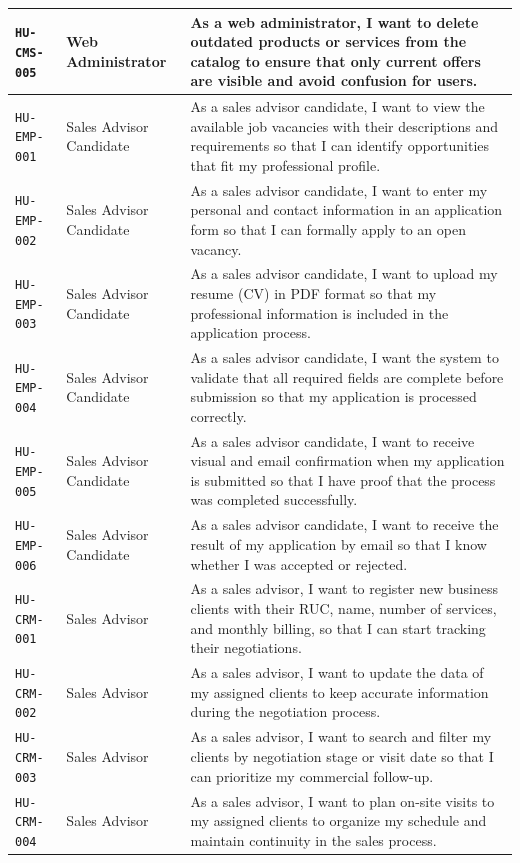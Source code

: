 \documentclass[letterpaper%
, oneside%
, 12pt%
, memoireprojet%
, english%
,creativecommons,hyperref, withAlgo2e %
]{thETS}
\begin{document}
\begin{longtable}{|L{2.5cm}|L{3.2cm}|L{7.9cm}|}
\hline
\texttt{HU-CMS-005} & Web Administrator & As a web administrator, I want to delete outdated products or services from the catalog to ensure that only current offers are visible and avoid confusion for users. \\
\hline
\texttt{HU-EMP-001} & Sales Advisor Candidate & As a sales advisor candidate, I want to view the available job vacancies with their descriptions and requirements so that I can identify opportunities that fit my professional profile. \\
\hline
\texttt{HU-EMP-002} & Sales Advisor Candidate & As a sales advisor candidate, I want to enter my personal and contact information in an application form so that I can formally apply to an open vacancy. \\
\hline
\texttt{HU-EMP-003} & Sales Advisor Candidate & As a sales advisor candidate, I want to upload my resume (CV) in PDF format so that my professional information is included in the application process. \\
\hline
\texttt{HU-EMP-004} & Sales Advisor Candidate & As a sales advisor candidate, I want the system to validate that all required fields are complete before submission so that my application is processed correctly. \\
\hline
\texttt{HU-EMP-005} & Sales Advisor Candidate & As a sales advisor candidate, I want to receive visual and email confirmation when my application is submitted so that I have proof that the process was completed successfully. \\
\hline
\texttt{HU-EMP-006} & Sales Advisor Candidate & As a sales advisor candidate, I want to receive the result of my application by email so that I know whether I was accepted or rejected. \\
\hline
\texttt{HU-CRM-001} & Sales Advisor & As a sales advisor, I want to register new business clients with their RUC, name, number of services, and monthly billing, so that I can start tracking their negotiations. \\
\hline
\texttt{HU-CRM-002} & Sales Advisor & As a sales advisor, I want to update the data of my assigned clients to keep accurate information during the negotiation process. \\
\hline
\texttt{HU-CRM-003} & Sales Advisor & As a sales advisor, I want to search and filter my clients by negotiation stage or visit date so that I can prioritize my commercial follow-up. \\
\hline
\texttt{HU-CRM-004} & Sales Advisor & As a sales advisor, I want to plan on-site visits to my assigned clients to organize my schedule and maintain continuity in the sales process. \\

\end{longtable}
\end{document}
